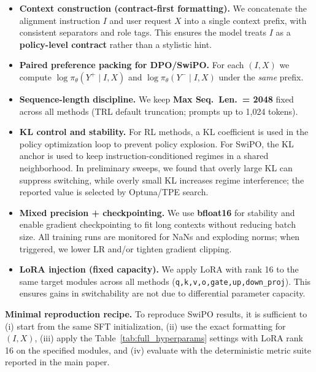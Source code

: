 \begin{itemize}[leftmargin=*,itemsep=2.5pt]
    \item \textbf{Context construction (contract-first formatting).}
    We concatenate the alignment instruction $I$ and user request $X$ into a single context prefix, with consistent separators and role tags.
    This ensures the model treats $I$ as a \textbf{policy-level contract} rather than a stylistic hint.

    \item \textbf{Paired preference packing for \textsc{DPO}/SwiPO.}
    For each $(I,X)$ we compute $\log\pi_\theta(Y^+\mid I,X)$ and $\log\pi_\theta(Y^-\mid I,X)$ under the \emph{same} prefix.

    \item \textbf{Sequence-length discipline.}
    We keep \textbf{Max Seq.\ Len.\ = 2048} fixed across all methods (TRL default truncation; prompts up to 1,024 tokens).

    \item \textbf{KL control and stability.}
    For RL methods, a KL coefficient is used in the policy optimization loop to prevent policy explosion.
    For SwiPO, the KL anchor is used to keep instruction-conditioned regimes in a shared neighborhood.
    In preliminary sweeps, we found that overly large KL can suppress switching, while overly small KL increases regime interference; the reported value is selected by Optuna/TPE search.

    \item \textbf{Mixed precision + checkpointing.}
    We use \textbf{bfloat16} for stability and enable gradient checkpointing to fit long contexts without reducing batch size.
    All training runs are monitored for NaNs and exploding norms; when triggered, we lower LR and/or tighten gradient clipping.

    \item \textbf{LoRA injection (fixed capacity).}
    We apply LoRA with rank 16 to the same target modules across all methods (\texttt{q,k,v,o,gate,up,down\_proj}).
    This ensures gains in switchability are not due to differential parameter capacity.
\end{itemize}

\vspace{-0.25em}
\noindent
\textbf{Minimal reproduction recipe.}
To reproduce SwiPO results, it is sufficient to (i) start from the same SFT initialization, (ii) use the exact formatting for $(I,X)$, (iii) apply the Table~\ref{tab:full_hyperparams} settings with LoRA rank 16 on the specified modules, and (iv) evaluate with the deterministic metric suite reported in the main paper.




